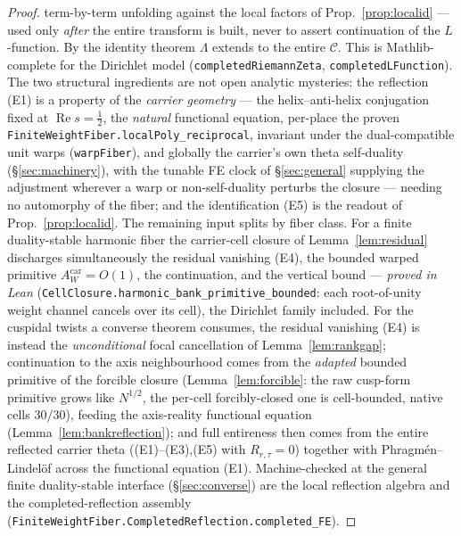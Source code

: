 \documentclass[11pt]{article}
\theoremstyle{definition}
\renewcommand{\Re}{\operatorname{Re}}
\begin{document}
\begin{proof}
term-by-term unfolding against the local factors of Prop.~\ref{prop:localid} --- used only \emph{after} the
entire transform is built, never to assert continuation of the $L$-function. By the identity theorem
$\Lambda$ extends to the entire $\mathcal C$. This is Mathlib-complete for the Dirichlet model
(\texttt{completedRiemannZeta}, \texttt{completedLFunction}). The two structural ingredients are not open
analytic mysteries: the reflection \textup{(E1)} is a property of the \emph{carrier geometry} --- the
helix--anti-helix conjugation fixed at $\Re s=\tfrac12$, the \emph{natural} functional equation, per-place
the proven \texttt{FiniteWeightFiber.localPoly\_reciprocal}, invariant under the dual-compatible unit warps
(\texttt{warpFiber}), and globally the carrier's own theta self-duality (\S\ref{sec:machinery}), with the
tunable FE clock of \S\ref{sec:general} supplying the adjustment wherever a warp or non-self-duality
perturbs the closure --- needing no automorphy of the fiber; and the identification \textup{(E5)} is the
readout of Prop.~\ref{prop:localid}. The remaining input splits by fiber class. For a finite duality-stable
harmonic fiber the carrier-cell closure of Lemma~\ref{lem:residual} discharges simultaneously the residual
vanishing \textup{(E4)}, the bounded warped primitive $A^{\mathrm{car}}_W=O(1)$, the continuation, and the
vertical bound --- \emph{proved in Lean} (\texttt{CellClosure.harmonic\_bank\_primitive\_bounded}: each
root-of-unity weight channel cancels over its cell), the Dirichlet family included. For the cuspidal twists a
converse theorem consumes, the residual vanishing \textup{(E4)} is instead the \emph{unconditional} focal
cancellation of Lemma~\ref{lem:rankgap}; continuation to the axis neighbourhood comes from the \emph{adapted}
bounded primitive of the forcible closure (Lemma~\ref{lem:forcible}: the raw cusp-form primitive grows like
$N^{1/2}$, the per-cell forcibly-closed one is cell-bounded, native cells $30/30$), feeding the axis-reality
functional equation (Lemma~\ref{lem:bankreflection}); and full entireness then comes from the entire reflected carrier theta
(\textup{(E1)--(E3),(E5)} with $R_{r,\tau}=0$) together with Phragm\'en--Lindel\"of across the functional
equation \textup{(E1)}. Machine-checked at the general finite
duality-stable interface (\S\ref{sec:converse}) are the local reflection algebra and the
completed-reflection assembly (\texttt{FiniteWeightFiber.CompletedReflection.completed\_FE}).
\end{proof}
\end{document}
